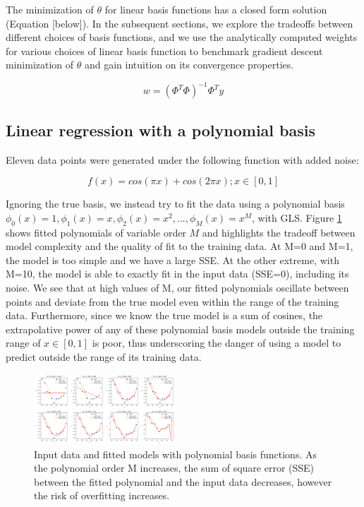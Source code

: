 \documentclass[10pt, twocolumn]{article}
\begin{document}
The minimization of $\theta$ for linear basis functions has a closed form solution (Equation [below]). In the subsequent sections, we explore the tradeoffs between different choices of basis functions, and we use the analytically computed weights for various choices of linear basis function to benchmark gradient descent minimization of $\theta$ and gain intuition on its convergence properties. 

$$w = (\Phi^T\Phi)^{-1}\Phi^Ty$$

\subsection{Linear regression with a polynomial basis}

Eleven data points were generated under the following function with added noise:

$$f(x) = cos(\pi x) + cos(2\pi x); x \in [0,1]$$

Ignoring the true basis, we instead try to fit the data using a polynomial basis $\phi_0(x) = 1, \phi_1(x) = x, \phi_2(x) = x^2, ... , \phi_M(x) = x^M$, with GLS.  Figure \ref{fig:polyfit} shows fitted polynomials of variable order $M$ and highlights the tradeoff between model complexity and the quality of fit to the training data. At M=0 and M=1, the model is too simple and we have a large SSE. At the other extreme, with M=10, the model is able to exactly fit in the input data (SSE=0), including its noise. We see that at high values of M, our fitted polynomials oscillate between points and deviate from the true model even within the range of the training data. Furthermore, since we know the true model is a sum of cosines, the extrapolative power of any of these polynomial basis models outside the training range of $x \in [0,1]$ is poor, thus underscoring the danger of using a model to predict outside the range of its training data.

\begin{figure}
\caption{Input data and fitted models with polynomial basis functions. As the polynomial order M increases, the sum of square error (SSE) between the fitted polynomial and the input data decreases, however the risk of overfitting increases.}
\begin{center}
\includegraphics[width=200px]{all_regress_m}
\end{center}
\label{fig:polyfit}
\end{figure}
\end{document}
